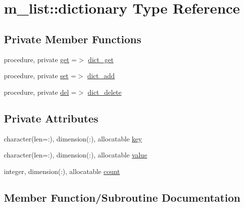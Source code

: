 \hypertarget{structm__list_1_1dictionary}{}\section{m\+\_\+list\+:\+:dictionary Type Reference}
\label{structm__list_1_1dictionary}
\subsection*{Private Member Functions}
\begin{DoxyCompactItemize}
\item 
procedure, private \mbox{\hyperlink{structm__list_1_1dictionary_acdf4e3b94e40183a708f5fd4043d97ef}{get}} =$>$ \mbox{\hyperlink{namespacem__list_a7b9bb0b8fa4b0eeef45d7fcdc21f8bf3}{dict\+\_\+get}}
\item 
procedure, private \mbox{\hyperlink{structm__list_1_1dictionary_a06890acc4e3beb0df2362d99c731c862}{set}} =$>$ \mbox{\hyperlink{namespacem__list_aca66691fd75ea79859a1b4505d2125bb}{dict\+\_\+add}}
\item 
procedure, private \mbox{\hyperlink{structm__list_1_1dictionary_a8ae445cc466d22dffb173a80cc79215a}{del}} =$>$ \mbox{\hyperlink{namespacem__list_aa562d18ce6890a8a1a96d77ff1d39948}{dict\+\_\+delete}}
\end{DoxyCompactItemize}
\subsection*{Private Attributes}
\begin{DoxyCompactItemize}
\item 
character(len=\+:), dimension(\+:), allocatable \mbox{\hyperlink{structm__list_1_1dictionary_af8502b1d3e850ca83eca50abbd79b6ae}{key}}
\item 
character(len=\+:), dimension(\+:), allocatable \mbox{\hyperlink{structm__list_1_1dictionary_adaa76f04dc0ba6808c76805f7b4864b1}{value}}
\item 
integer, dimension(\+:), allocatable \mbox{\hyperlink{structm__list_1_1dictionary_af8dbd37f43073371328c97749763e8a3}{count}}
\end{DoxyCompactItemize}


\subsection{Member Function/\+Subroutine Documentation}
\mbox{\label{structm__list_1_1dictionary_a8ae445cc466d22dffb173a80cc79215a}} 
